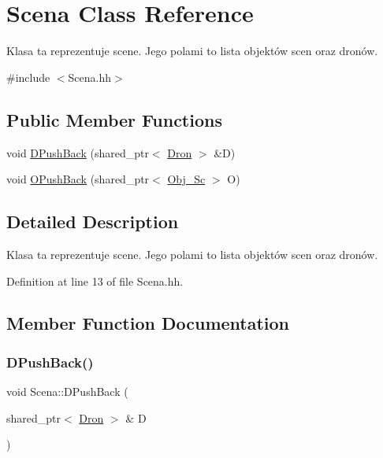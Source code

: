 \hypertarget{class_scena}{}\section{Scena Class Reference}
\label{class_scena}


Klasa ta reprezentuje scene. Jego polami to lista objektów scen oraz dronów.  




{\ttfamily \#include $<$Scena.\+hh$>$}

\subsection*{Public Member Functions}
\begin{DoxyCompactItemize}
\item 
void \hyperlink{class_scena_a058812f85dc08a6e4b66f38028393d64}{D\+Push\+Back} (shared\+\_\+ptr$<$ \hyperlink{class_dron}{Dron} $>$ \&D)
\item 
void \hyperlink{class_scena_adf77e0e73d6bc9aa0c8b0a27225aaa14}{O\+Push\+Back} (shared\+\_\+ptr$<$ \hyperlink{class_obj___sc}{Obj\+\_\+\+Sc} $>$ O)
\end{DoxyCompactItemize}


\subsection{Detailed Description}
Klasa ta reprezentuje scene. Jego polami to lista objektów scen oraz dronów. 

Definition at line 13 of file Scena.\+hh.



\subsection{Member Function Documentation}
\mbox{\label{class_scena_a058812f85dc08a6e4b66f38028393d64}} 
\subsubsection{\texorpdfstring{D\+Push\+Back()}{DPushBack()}}
{\footnotesize\ttfamily void Scena\+::\+D\+Push\+Back (\begin{DoxyParamCaption}\item[{shared\+\_\+ptr$<$ \hyperlink{class_dron}{Dron} $>$ \&}]{D }\end{DoxyParamCaption})}



